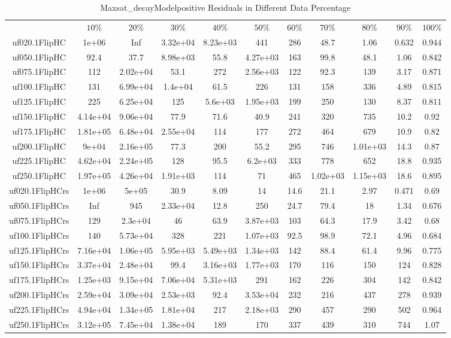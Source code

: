 \begin{table}[htbp]
\caption{Maxsat_decayModelpositive Residuals in Different Data Percentage}
\centering
\begin{tabular}{|ccccccccccc|}
\hline
 & $10\%$ & $20\%$ & $30\%$ & $40\%$ & $50\%$ & $60\%$ & $70\%$ & $80\%$ & $90\%$ & $100\%$ \\
uf020.1FlipHC & 1e+06 &  Inf & 3.32e+04 & 8.23e+03 &  441 &  286 & 48.7 & 1.06 & 0.632 & 0.944 \\
uf050.1FlipHC & 92.4 & 37.7 & 8.98e+03 & 55.8 & 4.27e+03 &  163 & 99.8 & 48.1 & 1.06 & 0.842 \\
uf075.1FlipHC &  112 & 2.02e+04 & 53.1 &  272 & 2.56e+03 &  122 & 92.3 &  139 & 3.17 & 0.871 \\
uf100.1FlipHC &  131 & 6.99e+04 & 1.4e+04 & 61.5 &  226 &  131 &  158 &  336 & 4.89 & 0.815 \\
uf125.1FlipHC &  225 & 6.25e+04 &  125 & 5.6e+03 & 1.95e+03 &  199 &  250 &  130 & 8.37 & 0.811 \\
uf150.1FlipHC & 4.14e+04 & 9.06e+04 & 77.9 & 71.6 & 40.9 &  241 &  320 &  735 & 10.2 & 0.92 \\
uf175.1FlipHC & 1.81e+05 & 6.48e+04 & 2.55e+04 &  114 &  177 &  272 &  464 &  679 & 10.9 & 0.82 \\
uf200.1FlipHC & 9e+04 & 2.16e+05 & 77.3 &  200 & 55.2 &  295 &  746 & 1.01e+03 & 14.3 & 0.87 \\
uf225.1FlipHC & 4.62e+04 & 2.24e+05 &  128 & 95.5 & 6.2e+03 &  333 &  778 &  652 & 18.8 & 0.935 \\
uf250.1FlipHC & 1.97e+05 & 4.26e+04 & 1.91e+03 &  114 &   71 &  465 & 1.02e+03 & 1.15e+03 & 18.6 & 0.895 \\
uf020.1FlipHCrs & 1e+06 & 5e+05 & 30.9 & 8.09 &   14 & 14.6 & 21.1 & 2.97 & 0.471 & 0.69 \\
uf050.1FlipHCrs &  Inf &  945 & 2.33e+04 & 12.8 &  250 & 24.7 & 79.4 &   18 & 1.34 & 0.676 \\
uf075.1FlipHCrs &  129 & 2.3e+04 &   46 & 63.9 & 3.87e+03 &  103 & 64.3 & 17.9 & 3.42 & 0.68 \\
uf100.1FlipHCrs &  140 & 5.73e+04 &  328 &  221 & 1.07e+03 & 92.5 & 98.9 & 72.1 & 4.96 & 0.684 \\
uf125.1FlipHCrs & 7.16e+04 & 1.06e+05 & 5.95e+03 & 5.49e+03 & 1.34e+03 &  142 & 88.4 & 61.4 & 9.96 & 0.775 \\
uf150.1FlipHCrs & 3.37e+04 & 2.48e+04 & 99.4 & 3.16e+03 & 1.77e+03 &  170 &  116 &  150 &  124 & 0.828 \\
uf175.1FlipHCrs & 1.25e+03 & 9.15e+04 & 7.06e+04 & 5.31e+03 &  291 &  162 &  226 &  304 &  142 & 0.842 \\
uf200.1FlipHCrs & 2.59e+04 & 3.09e+04 & 2.53e+03 & 92.4 & 3.53e+04 &  232 &  216 &  437 &  278 & 0.939 \\
uf225.1FlipHCrs & 4.94e+04 & 1.34e+05 & 1.81e+04 &  217 & 2.18e+03 &  290 &  457 &  290 &  502 & 0.964 \\
uf250.1FlipHCrs & 3.12e+05 & 7.45e+04 & 1.38e+04 &  189 &  170 &  337 &  439 &  310 &  744 & 1.07 \\
\hline
\end{tabular}
\end{table}
